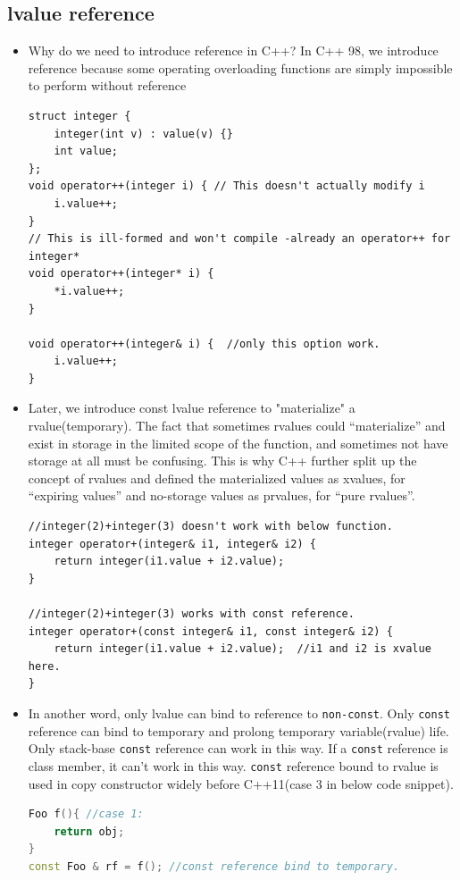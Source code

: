 \documentclass[a4paper,11pt,twoside]{book}
\begin{document}
\subsection{lvalue reference}
\begin{itemize}
	\item Why do we need to introduce reference in C++? In C++ 98, we introduce reference because some operating overloading functions are simply impossible to perform without reference
\begin{lstlisting}
struct integer { 
	integer(int v) : value(v) {}
	int value; 
};
void operator++(integer i) { // This doesn't actually modify i
	i.value++;
}
// This is ill-formed and won't compile -already an operator++ for integer*
void operator++(integer* i) { 
	*i.value++;
}

void operator++(integer& i) {  //only this option work.
	i.value++;
}
\end{lstlisting}

	\item Later, we introduce const lvalue reference to "materialize" a rvalue(temporary). The fact that sometimes rvalues could “materialize” and exist in storage in the limited scope of the function, and sometimes not have storage at all must be confusing. This is why C++ further split up the concept of rvalues and defined the materialized values as xvalues, for “expiring values” and no-storage values as prvalues, for “pure rvalues”.
\begin{lstlisting}
//integer(2)+integer(3) doesn't work with below function.
integer operator+(integer& i1, integer& i2) {
	return integer(i1.value + i2.value);
}

//integer(2)+integer(3) works with const reference.
integer operator+(const integer& i1, const integer& i2) {
	return integer(i1.value + i2.value);  //i1 and i2 is xvalue here.
}	
\end{lstlisting}
     


\item  In another word, only lvalue can bind to reference to \texttt{non-const}. Only \texttt{const} reference can bind to temporary and prolong temporary variable(rvalue) life. Only stack-base \texttt{const} reference can work in this way. If a \texttt{const} reference is class member, it can't work in this way. \texttt{const} reference bound to rvalue is used in copy constructor widely before C++11(case 3 in below code snippet).
\begin{lstlisting}[frame=single, language=c++]
Foo f(){ //case 1:
	return obj;
}
const Foo & rf = f(); //const reference bind to temporary.


\end{lstlisting}
\end{itemize}
\end{document}
